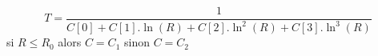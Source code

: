 \[
T = \frac{1}{C[0] + C[1].\ln (R)  + C[2].\ln^2 (R) + C[3].\ln^3 (R) }
\]
si $R \leq R_0 $ alors $C=C_1$ sinon $C=C_2$
